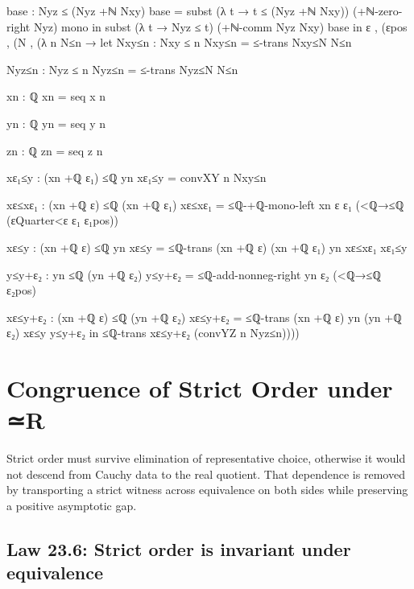 \documentclass[11pt,a4paper]{book}
\def\mathbb#1{#1}%
\def\texorpdfstring#1#2{#2}%
\begin{document}
\begin{code}
{            base : Nyz ≤ (Nyz +ℕ Nxy)
            base = subst (λ t → t ≤ (Nyz +ℕ Nxy)) (+ℕ-zero-right Nyz) mono
          in
          subst (λ t → Nyz ≤ t) (+ℕ-comm Nyz Nxy) base
      in
      ε , (εpos ,
        (N , (λ n N≤n →
          let
            Nxy≤n : Nxy ≤ n
            Nxy≤n = ≤-trans Nxy≤N N≤n

            Nyz≤n : Nyz ≤ n
            Nyz≤n = ≤-trans Nyz≤N N≤n

            xn : ℚ
            xn = seq x n

            yn : ℚ
            yn = seq y n

            zn : ℚ
            zn = seq z n

            xε₁≤y : (xn +ℚ ε₁) ≤ℚ yn
            xε₁≤y = convXY n Nxy≤n

            xε≤xε₁ : (xn +ℚ ε) ≤ℚ (xn +ℚ ε₁)
            xε≤xε₁ =
              ≤ℚ-+ℚ-mono-left xn ε ε₁ (<ℚ→≤ℚ (εQuarter<ε ε₁ ε₁pos))

            xε≤y : (xn +ℚ ε) ≤ℚ yn
            xε≤y = ≤ℚ-trans {(xn +ℚ ε)} {(xn +ℚ ε₁)} {yn} xε≤xε₁ xε₁≤y

            y≤y+ε₂ : yn ≤ℚ (yn +ℚ ε₂)
            y≤y+ε₂ = ≤ℚ-add-nonneg-right yn ε₂ (<ℚ→≤ℚ ε₂pos)

            xε≤y+ε₂ : (xn +ℚ ε) ≤ℚ (yn +ℚ ε₂)
            xε≤y+ε₂ = ≤ℚ-trans {(xn +ℚ ε)} {yn} {(yn +ℚ ε₂)} xε≤y y≤y+ε₂
          in
            ≤ℚ-trans xε≤y+ε₂ (convYZ n Nyz≤n))))
  }

\end{code}


\section{Congruence of Strict Order under \texorpdfstring{$\simeq_{\mathbb{R}}$}{≃R}}

Strict order must survive elimination of representative choice, otherwise it would not descend from Cauchy data to the real quotient. That dependence is removed by transporting a strict witness across equivalence on both sides while preserving a positive asymptotic gap.

\subsection*{Law 23.6: Strict order is invariant under equivalence}
\end{document}
